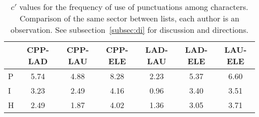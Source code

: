 \begin{table}
  \centering
  \caption{$c'$ values for the frequency of use of punctuations among characters. Comparison of the same sector between lists, each author is an observation. See subsection~\ref{subsec:di} for discussion and directions.}
  \begin{tabular}{l| c c c c c c}
 & CPP-LAD & CPP-LAU & CPP-ELE & LAD-LAU & LAD-ELE & LAU-ELE \\\hline
P & 5.74 & 4.88 & 8.28 & 2.23 & 5.37 & 6.60 \\
I & 3.23 & 2.49 & 4.16 & 0.96 & 3.40 & 3.51 \\
H & 2.49 & 1.87 & 4.02 & 1.36 & 3.05 & 3.71 \\
  \end{tabular}
  \label{tab:kolPctInter}
\end{table}
 
